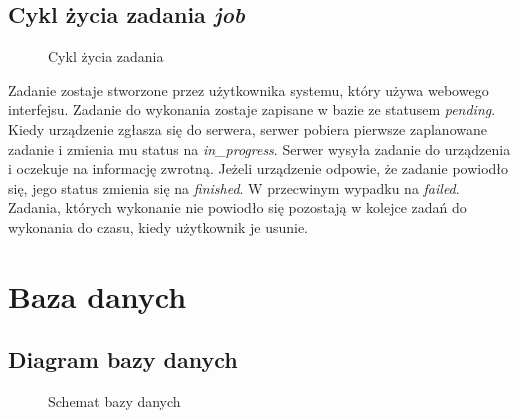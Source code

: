 \documentclass[polish,12pt]{aghthesis}
\begin{document}
\subsection{Cykl życia zadania \emph{job}}
  \begin{figure}[htbp]
    \centering
        \caption{Cykl życia zadania}
  \end{figure}

Zadanie zostaje stworzone przez użytkownika systemu, który używa webowego interfejsu. Zadanie do wykonania zostaje zapisane w bazie ze statusem \emph{pending}. Kiedy urządzenie zgłasza się do serwera, serwer pobiera pierwsze zaplanowane zadanie i zmienia mu status na \emph{in\_progress}. Serwer wysyła zadanie do urządzenia i oczekuje na informację zwrotną. Jeżeli urządzenie odpowie, że zadanie powiodło się, jego status zmienia się na \emph{finished}. W przecwinym wypadku na \emph{failed}. Zadania, których wykonanie nie powiodło się pozostają w kolejce zadań do wykonania do czasu, kiedy użytkownik je usunie.

\section{Baza danych}

\subsection{Diagram bazy danych}
  \begin{figure}[htbp]
    \centering
        \caption{Schemat bazy danych}
  \end{figure}
\end{document}
